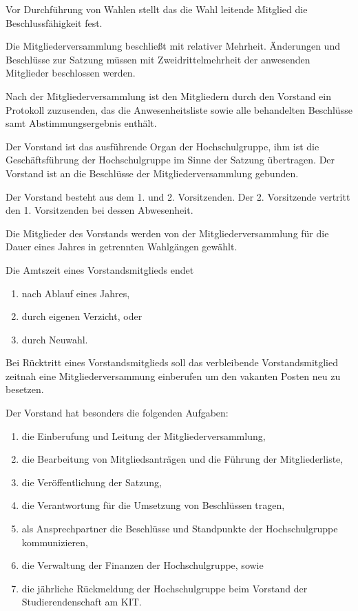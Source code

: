 \documentclass[a4paper, parskip=half, numbers=noenddot]{scrartcl}
\begin{document}
\begin{contract}
Vor Durchführung von Wahlen stellt das die Wahl leitende Mitglied die
Beschlussfähigkeit fest.

Die Mitgliederversammlung beschließt mit relativer Mehrheit.
Änderungen und Beschlüsse zur Satzung müssen mit Zweidrittelmehrheit der
anwesenden Mitglieder beschlossen werden.

Nach der Mitgliederversammlung ist den Mitgliedern durch den Vorstand ein
Protokoll zuzusenden, das die Anwesenheitsliste sowie alle behandelten
Beschlüsse samt Abstimmungsergebnis enthält.



%
%


Der Vorstand ist das ausführende Organ der Hochschulgruppe, ihm ist die
Geschäftsführung der Hochschulgruppe im Sinne der Satzung übertragen.
Der Vorstand ist an die Beschlüsse der Mitgliederversammlung gebunden.

Der Vorstand besteht aus dem 1. und 2. Vorsitzenden.
Der 2. Vorsitzende vertritt den 1. Vorsitzenden bei dessen Abwesenheit.

Die Mitglieder des Vorstands werden von der Mitgliederversammlung für die Dauer
eines Jahres in getrennten Wahlgängen gewählt.

Die Amtszeit eines Vorstandsmitglieds endet
\begin{enumerate}
  \item nach Ablauf eines Jahres,
  \item durch eigenen Verzicht, oder
  \item durch Neuwahl.
\end{enumerate}
Bei Rücktritt eines Vorstandsmitglieds soll das verbleibende Vorstandsmitglied
zeitnah eine Mitgliederversammung einberufen um den vakanten Posten neu zu
besetzen.

Der Vorstand hat besonders die folgenden Aufgaben:
\begin{enumerate}
  \item die Einberufung und Leitung der Mitgliederversammlung,
  \item die Bearbeitung von Mitgliedsanträgen und die Führung der
    Mitgliederliste,
  \item die Veröffentlichung der Satzung,
  \item die Verantwortung für die Umsetzung von Beschlüssen tragen,
  \item als Ansprechpartner die Beschlüsse und Standpunkte der Hochschulgruppe
    kommunizieren,
  \item die Verwaltung der Finanzen der Hochschulgruppe, sowie
  \item die jährliche Rückmeldung der Hochschulgruppe beim Vorstand der
    Studierendenschaft am KIT.
\end{enumerate}


\end{contract}
\end{document}
